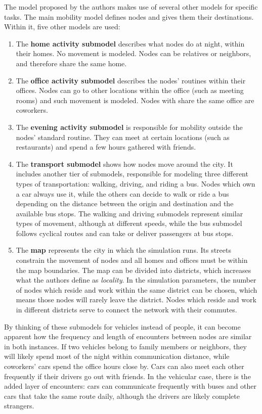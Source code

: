 The model proposed by the authors makes use of several other models for specific tasks.
The main mobility model defines nodes and gives them their destinations.
Within it, five other models are used:
\begin{enumerate}
\item 
The \textbf{home activity submodel} describes what nodes do at night, within their homes.
No movement is modeled.
Nodes can be relatives or neighbors, and therefore share the same home.
\item 
The \textbf{office activity submodel} describes the nodes' routines within their offices.
Nodes can go to other locations within the office (such as meeting rooms) and such movement is modeled.
Nodes with share the same office are coworkers.
\item 
The \textbf{evening activity submodel} is responsible for mobility outside the nodes' standard routine. 
They can meet at certain locations (such as restaurants) and spend a few hours gathered with friends.
\item
The \textbf{transport submodel} shows how nodes move around the city.
It includes another tier of submodels, responsible for modeling three different types of transportation: walking, driving, and riding a bus.
Nodes which own a car always use it, while the others can decide to walk or ride a bus depending on the distance between the origin and destination and the available bus stops.
The walking and driving submodels represent similar types of movement, although at different speeds, while the bus submodel follows cyclical routes and can take or deliver passengers at bus stops.
\item
The \textbf{map} represents the city in which the simulation runs.
Its streets constrain the movement of nodes and all homes and offices must be within the map boundaries.
The map can be divided into districts, which increases what the authors define as \textit{locality}.
In the simulation parameters, the number of nodes which reside and work within the same district can be chosen, which means those nodes will rarely leave the district.
Nodes which reside and work in different districts serve to connect the network with their commutes.
\end{enumerate}

By thinking of these submodels for vehicles instead of people, it can become apparent how the frequency and length of encounters between nodes are similar in both instances.
If two vehicles belong to family members or neighbors, they will likely spend most of the night within communication distance, while coworkers' cars spend the office hours close by.
Cars can also meet each other frequently if their drivers go out with friends.
In the vehicular case, there is the added layer of encounters: cars can communicate frequently with buses and other cars that take the same route daily, although the drivers are likely complete strangers.

